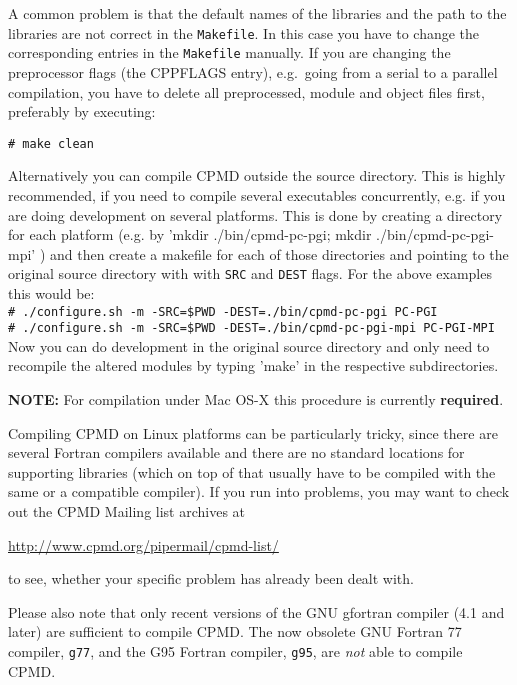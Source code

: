 \documentclass[twoside,10pt,titlepage,a4paper]{article}
\newcommand{\htref}[2]{\href{#1}{#2}}
\newcommand{\htref}[2]{\htmladdnormallink{#2}{#1}}
\newcommand{\shellcommand}[1]{%
  \vspace*{3mm}
  \noindent
  \texttt{\# #1}
  \vspace*{3mm}
}
\begin{document}
A common problem is that the default names of the libraries and the path to
the libraries are not correct in the \texttt{Makefile}. In this case you
have to change the corresponding entries in the \texttt{Makefile} manually.
If you are changing the preprocessor flags (the CPPFLAGS entry), 
e.g.\ going from a serial to a parallel compilation, you have to delete 
all preprocessed, module and object files first, preferably by executing:

\shellcommand{make clean}

\vspace{3mm}
  Alternatively you can compile CPMD outside the source directory.
  This is highly recommended, if you need to compile several executables
  concurrently, e.g. if you are doing development on several platforms.
  This is done by creating a directory for each platform
  (e.g. by 'mkdir ./bin/cpmd-pc-pgi; mkdir ./bin/cpmd-pc-pgi-mpi'  ) and then
  create a makefile for each of those directories and pointing to the
  original source directory with with \texttt{SRC} and \texttt{DEST}
  flags. For the above examples this would be:\\
\shellcommand{./configure.sh -m -SRC=\$PWD -DEST=./bin/cpmd-pc-pgi PC-PGI}\\
\shellcommand{./configure.sh -m -SRC=\$PWD -DEST=./bin/cpmd-pc-pgi-mpi  PC-PGI-MPI}\\
  Now you can do development in the original source directory and only
  need to recompile the altered modules by typing 'make' in the
  respective subdirectories.

\textbf{NOTE:} For compilation under Mac OS-X this procedure is
  currently \textbf{required}.


\vspace{3mm}
  Compiling CPMD on Linux platforms can be particularly tricky,
  since there are several Fortran compilers available and there
  are no standard locations for supporting libraries (which on top
  of that usually have to be compiled with the same or a compatible
  compiler). If you run into problems, you may want to check out the
  CPMD Mailing list archives at

  \centerline{\htref{http://www.cpmd.org/pipermail/cpmd-list/}{http://www.cpmd.org/pipermail/cpmd-list/}}

  to see, whether your specific problem has already been dealt with.

\vspace{7mm}
  Please also note that only recent versions of the GNU gfortran compiler
  (4.1 and later) are sufficient to compile CPMD. The now obsolete GNU 
  Fortran 77 compiler, \texttt{g77}, and the G95 Fortran compiler, 
  \texttt{g95}, are {\em not} able to compile CPMD.
  \clearpage
\end{document}
